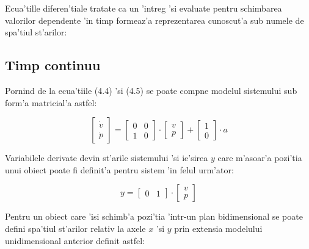 \documentclass[12pt,a4paper,twoside]{report}
\begin{document}
 Ecua'tille diferen'tiale tratate ca un 'intreg 'si evaluate pentru schimbarea valorilor dependente 'in timp formeaz'a reprezentarea cunoscut'a sub numele de spa'tiul st'arilor:

\subsection{Timp continuu}

Pornind de la ecua'tiile (4.4) 'si (4.5) se poate compne modelul sistemului sub form'a matricial'a astfel:

\begin{equation}
     \begin{bmatrix} \dot{v} \\ \dot{p} \end{bmatrix} =  \begin{bmatrix} 0 & 0 \\ 1 & 0 \end{bmatrix} \cdot \begin{bmatrix} v \\ p \end{bmatrix} +  \begin{bmatrix} 1 \\ 0 \end{bmatrix} \cdot a 
\end{equation}

Variabilele derivate devin st'arile sistemului 'si ie'sirea $y$ care m'asoar'a pozi'tia unui obiect poate fi definit'a pentru sistem 'in felul urm'ator:


\begin{equation}
    y = \begin{bmatrix} 0 & 1 \end{bmatrix} \cdot \begin{bmatrix} v \\ p \end{bmatrix}
\end{equation}

Pentru un obiect care 'isi schimb'a pozi'tia 'intr-un plan bidimensional se poate defini spa'tiul st'arilor relativ la axele $x$ 'si $y$ prin extensia modelului unidimensional anterior definit astfel:
\end{document}
